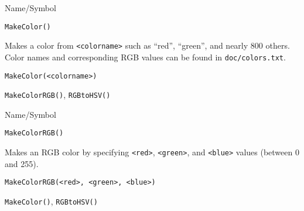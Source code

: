 \begin{desc}{Name/Symbol}
\item[Name/Symbol]	\verb+MakeColor()+

\item[Description] Makes a color from \verb+<colorname>+ such as
  ``red'', ``green'', and nearly 800 others.  Color names and
  corresponding RGB values can be found in \verb+doc/colors.txt+.

\item[Usage]
\begin{verbatim}
MakeColor(<colorname>)
\end{verbatim}

\item[Example]	

\item[See Also]	\verb+MakeColorRGB()+, \verb+RGBtoHSV()+
\end{desc}

\begin{desc}{Name/Symbol}
\item[Name/Symbol]	\verb+MakeColorRGB()+ 

\item[Description] Makes an RGB color by specifying \verb+<red>+,
  \verb+<green>+, and \verb+<blue>+ values (between 0 and 255).

\item[Usage]		
\begin{verbatim}
MakeColorRGB(<red>, <green>, <blue>)
\end{verbatim}

\item[Example]	

\item[See Also]	\verb+MakeColor()+, \verb+RGBtoHSV()+
\end{desc}




